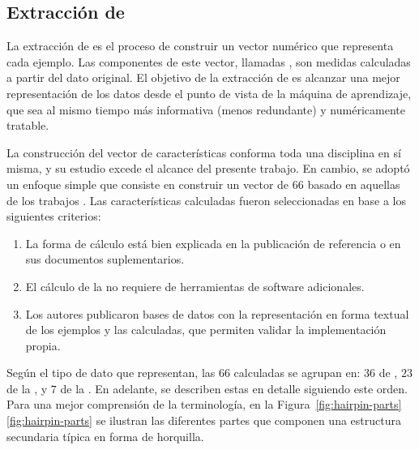 %
%
\subsection{Extracción de }
%
La extracción de  es el proceso de construir un vector
numérico que representa cada ejemplo.
Las componentes de este vector, llamadas , son
medidas calculadas a partir del dato original.
El objetivo de la extracción de  es alcanzar una mejor
representación de los datos desde el punto de vista de la máquina de
aprendizaje, que sea al mismo tiempo más informativa (menos
redundante) y numéricamente tratable.

La construcción del vector de características conforma toda una
disciplina en sí misma, y su estudio excede el alcance del presente
trabajo.
En cambio, se adoptó un enfoque simple que consiste en construir un
vector de $66$  basado en aquellas de los trabajos
\cite{xue,ng,batuwita}.
Las características calculadas fueron seleccionadas en base a los
siguientes criterios:
%
\begin{enumerate}
\item
  La forma de cálculo está bien explicada en la publicación de
  referencia o en sus documentos suplementarios.
\item
  El cálculo de la \caract{} no requiere de herramientas de software
  adicionales.
\item
  Los autores publicaron bases de datos con la representación en forma
  textual de los ejemplos y las  calculadas, que permiten
  validar la implementación propia.
\end{enumerate}
%
Según el tipo de dato que representan, las $66$  calculadas
se agrupan en: $36$  de , $23$  de la
, y $7$ de la .
En adelante, se describen estas  en detalle siguiendo este
orden.
Para una mejor comprensión de la terminología, en la
\iflatexml{}Figura~\ref{fig:hairpin-parts}\else\autoref{fig:hairpin-parts}\fi{}
se ilustran las diferentes partes que componen una estructura
secundaria típica en forma de horquilla.
